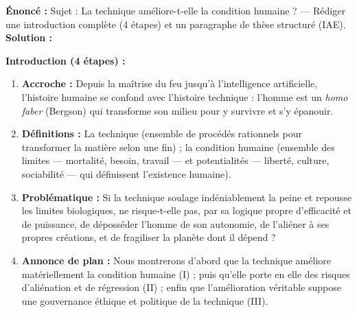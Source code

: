 \documentclass[11pt]{article}
\newcommand{\cle}[1]{{\popxbold\color{popdark}#1}}
\begin{document}
\begin{exoresolu}
\textbf{\'Enonc\'e :} Sujet : \guillemotleft La technique am\'eliore-t-elle la condition humaine ? \guillemotright --- R\'ediger une introduction compl\`ete (4 \'etapes) et un paragraphe de th\`ese structur\'e (IAE).
\tcblower
\textbf{Solution :}

\textbf{Introduction (4 \'etapes) :}
\begin{enumerate}
    \item \textbf{Accroche :} Depuis la ma\^itrise du feu jusqu'\`a l'intelligence artificielle, l'histoire humaine se confond avec l'histoire technique : l'homme est un \emph{homo faber} (Bergson) qui transforme son milieu pour y survivre et s'y \'epanouir.
    \item \textbf{D\'efinitions :} La \cle{technique} (ensemble de proc\'ed\'es rationnels pour transformer la mati\`ere selon une fin) ; la \cle{condition humaine} (ensemble des limites --- mortalit\'e, besoin, travail --- et potentialit\'es --- libert\'e, culture, sociabilit\'e --- qui d\'efinissent l'existence humaine).
    \item \textbf{Probl\'ematique :} Si la technique soulage ind\'eniablement la peine et repousse les limites biologiques, ne risque-t-elle pas, par sa logique propre d'efficacit\'e et de puissance, de d\'eposs\'eder l'homme de son autonomie, de l'ali\'ener \`a ses propres cr\'eations, et de fragiliser la plan\`ete dont il d\'epend ?
    \item \textbf{Annonce de plan :} Nous montrerons d'abord que la technique am\'eliore mat\'eriellement la condition humaine (I) ; puis qu'elle porte en elle des risques d'ali\'enation et de r\'egression (II) ; enfin que l'am\'elioration v\'eritable suppose une gouvernance \'ethique et politique de la technique (III).
\end{enumerate}


\end{exoresolu}
\end{document}
